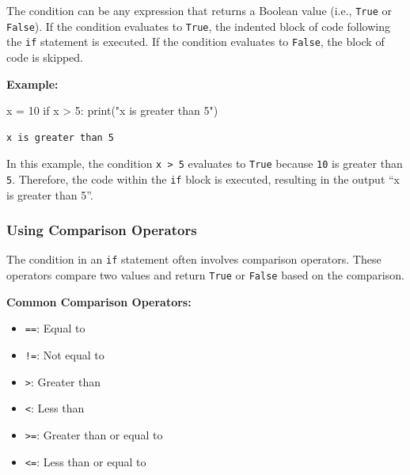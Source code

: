 \documentclass[
  letterpaper,
  DIV=11,
  numbers=noendperiod]{scrreprt}
\newenvironment{Shaded}{\begin{snugshade}}{\end{snugshade}}
\newcommand{\BuiltInTok}[1]{\textcolor[rgb]{0.00,0.23,0.31}{#1}}
\newcommand{\ControlFlowTok}[1]{\textcolor[rgb]{0.00,0.23,0.31}{#1}}
\newcommand{\DecValTok}[1]{\textcolor[rgb]{0.68,0.00,0.00}{#1}}
\newcommand{\NormalTok}[1]{\textcolor[rgb]{0.00,0.23,0.31}{#1}}
\newcommand{\OperatorTok}[1]{\textcolor[rgb]{0.37,0.37,0.37}{#1}}
\newcommand{\StringTok}[1]{\textcolor[rgb]{0.13,0.47,0.30}{#1}}
\providecommand{\tightlist}{%
  \setlength{\itemsep}{0pt}\setlength{\parskip}{0pt}}\usepackage{longtable,booktabs,array}
\begin{document}
The condition can be any expression that returns a Boolean value (i.e.,
\texttt{True} or \texttt{False}). If the condition evaluates to
\texttt{True}, the indented block of code following the \texttt{if}
statement is executed. If the condition evaluates to \texttt{False}, the
block of code is skipped.

\textbf{Example:}

\begin{Shaded}
\begin{Highlighting}[]
\NormalTok{x }\OperatorTok{=} \DecValTok{10}
\ControlFlowTok{if}\NormalTok{ x }\OperatorTok{\textgreater{}} \DecValTok{5}\NormalTok{:}
    \BuiltInTok{print}\NormalTok{(}\StringTok{"x is greater than 5"}\NormalTok{)}
\end{Highlighting}
\end{Shaded}

\begin{verbatim}
x is greater than 5
\end{verbatim}

In this example, the condition \texttt{x\ \textgreater{}\ 5} evaluates
to \texttt{True} because \texttt{10} is greater than \texttt{5}.
Therefore, the code within the \texttt{if} block is executed, resulting
in the output ``x is greater than 5''.

\hypertarget{using-comparison-operators}{%
\subsubsection{Using Comparison
Operators}\label{using-comparison-operators}}

The condition in an \texttt{if} statement often involves comparison
operators. These operators compare two values and return \texttt{True}
or \texttt{False} based on the comparison.

\textbf{Common Comparison Operators:}

\begin{itemize}
\tightlist
\item
  \texttt{==}: Equal to
\item
  \texttt{!=}: Not equal to
\item
  \texttt{\textgreater{}}: Greater than
\item
  \texttt{\textless{}}: Less than
\item
  \texttt{\textgreater{}=}: Greater than or equal to
\item
  \texttt{\textless{}=}: Less than or equal to
\end{itemize}
\end{document}
